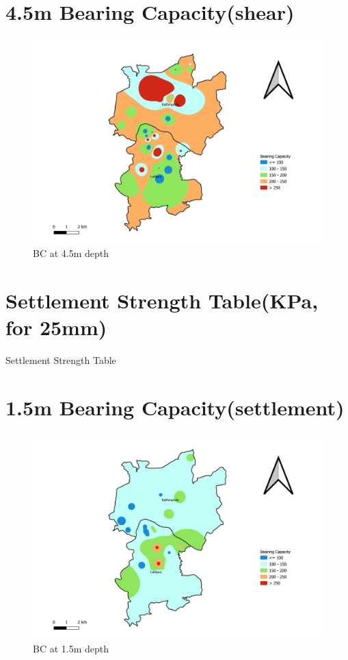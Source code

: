 \section{4.5m Bearing Capacity(shear)}
\begin{figure}[!hbt]
\centering
\includegraphics[width=\linewidth, height=\textheight,keepaspectratio]{in/map/Shear_4_5.png}
\caption{BC at 4.5m depth}
\end{figure}
\pagebreak

\section{Settlement Strength Table(KPa, for 25mm)}
\begin{table}[!h]
\caption{Settlement Strength Table}

\end{table}
\pagebreak

\section{1.5m Bearing Capacity(settlement)}
\begin{figure}[!hbt]
\centering
\includegraphics[width=\linewidth, height=\textheight,keepaspectratio]{in/map/Deflection_1_5.png}
\caption{BC at 1.5m depth}
\end{figure}
\pagebreak

